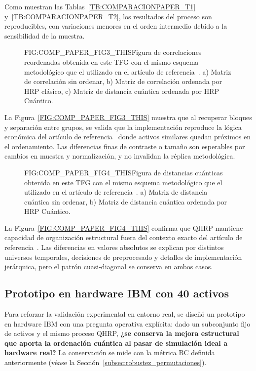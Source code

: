 Como muestran las Tablas~\ref{TB:COMPARACIONPAPER_T1} y~\ref{TB:COMPARACIONPAPER_T2}, los resultados del proceso son reproducibles, con variaciones menores en el orden intermedio debido a la sensibilidad de la muestra.

\begin{figure}[Comparación visual Fig. 3]{FIG:COMP_PAPER_FIG3_THIS}{Figura de correlaciones reordenadas obtenida en este TFG con el mismo esquema metodológico que el utilizado en el artículo de referencia~\cite{arian2025qhrp}. a) Matriz de correlación sin ordenar, b) Matriz de correlación ordenada por HRP clásico, c) Matriz de distancia cuántica ordenada por HRP Cuántico.}
\end{figure}

La Figura~\ref{FIG:COMP_PAPER_FIG3_THIS} muestra que al recuperar bloques y separación entre grupos, se valida que la implementación reproduce la lógica económica del artículo de referencia~\cite{arian2025qhrp} donde activos similares quedan próximos en el ordenamiento. Las diferencias finas de contraste o tamaño son esperables por cambios en muestra y normalización, y no invalidan la réplica metodológica.

\begin{figure}[Comparación visual Fig. 4]{FIG:COMP_PAPER_FIG4_THIS}{Figura de distancias cuánticas obtenida en este TFG con el mismo esquema metodológico que el utilizado en el artículo de referencia~\cite{arian2025qhrp}. a) Matriz de distancia cuántica sin ordenar, b) Matriz de distancia cuántica ordenada por HRP Cuántico.}
\end{figure}

La Figura~\ref{FIG:COMP_PAPER_FIG4_THIS} confirma que QHRP mantiene capacidad de organización estructural fuera del contexto exacto del artículo de referencia~\cite{arian2025qhrp}. Las diferencias en valores absolutos se explican por distintos universos temporales, decisiones de preprocesado y detalles de implementación jerárquica, pero el patrón cuasi-diagonal se conserva en ambos casos.

\subsection{Prototipo en hardware IBM con 40 activos}
\label{subsec:prototipo_hardware}
Para reforzar la validación experimental en entorno real, se diseñó un prototipo en hardware IBM con una pregunta operativa explícita: dado un subconjunto fijo de activos y el mismo proceso \gls{QHRP}, \textbf{¿se conserva la mejora estructural que aporta la ordenación cuántica al pasar de simulación ideal a hardware real?} La conservación se mide con la métrica $\mathrm{BC}$ definida anteriormente (véase la Sección~\ref{subsec:robustez_permutaciones}).

